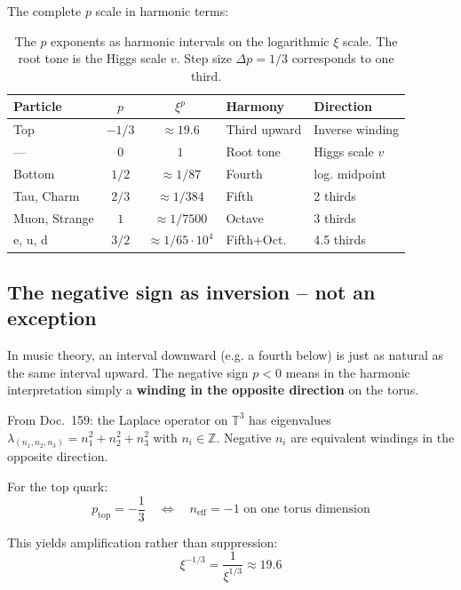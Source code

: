 The complete $p$ scale in harmonic terms:

\begin{table}[htbp]
\centering\small
\begin{tabular}{lccll}
\toprule
\textbf{Particle} & $p$ & \textbf{$\xi^p$} & \textbf{Harmony} & \textbf{Direction} \\
\midrule
Top          & $-1/3$ & ${\approx}19.6$        & Third upward  & Inverse winding \\
---          & $0$    & $1$                    & Root tone     & Higgs scale $v$ \\
Bottom       & $1/2$  & ${\approx}1/87$        & Fourth        & log. midpoint \\
Tau, Charm   & $2/3$  & ${\approx}1/384$       & Fifth         & 2 thirds \\
Muon, Strange & $1$   & ${\approx}1/7500$      & Octave        & 3 thirds \\
e, u, d      & $3/2$  & ${\approx}1/65{\cdot}10^4$ & Fifth+Oct. & 4.5 thirds \\
\bottomrule
\end{tabular}
\caption{The $p$ exponents as harmonic intervals on the logarithmic
$\xi$ scale. The root tone is the Higgs scale $v$.
Step size $\Delta p = 1/3$ corresponds to one third.}
\label{tab:harmonic}
\end{table}

\subsection{The negative sign as inversion -- not an exception}

In music theory, an interval downward (e.g. a fourth below) is just as
natural as the same interval upward. The negative sign $p < 0$ means
in the harmonic interpretation simply a \textbf{winding in the opposite
direction} on the torus.

From Doc.~159: the Laplace operator on $\mathbb{T}^3$ has eigenvalues
$\lambda_{(n_1,n_2,n_3)} = n_1^2 + n_2^2 + n_3^2$ with
$n_i \in \mathbb{Z}$. Negative $n_i$ are equivalent windings in the
opposite direction.

For the top quark:
\begin{equation}
    p_{\text{top}} = -\frac{1}{3}
    \quad \Longleftrightarrow \quad
    n_{\text{eff}} = -1 \text{ on one torus dimension}
\end{equation}

This yields amplification rather than suppression:
\begin{equation}
    \xi^{-1/3} = \frac{1}{\xi^{1/3}} \approx 19.6
\end{equation}

